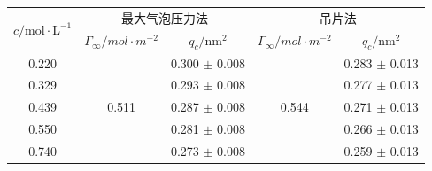 \begin{table}[ht]
\centering
{}
\begin{tabular}{ccccc}
\toprule
\multirow{2}{*}{$c / \mathrm{mol \cdot L^{-1}}$} & \multicolumn{2}{c}{最大气泡压力法} & \multicolumn{2}{c}{吊片法} \\
& $\Gamma_\infty/\si{mol\cdot m^{-2}}$ & $q_c / \mathrm{nm^2}$ & $\Gamma_\infty/\si{mol\cdot m^{-2}}$ & $q_c / \mathrm{nm^2}$ \\
\midrule
0.220 & \multirow{5}{*}{0.511} & 0.300 $\pm$ 0.008 & \multirow{5}{*}{0.544} & 0.283 $\pm$ 0.013\\
0.329 & & 0.293 $\pm$ 0.008 & & 0.277 $\pm$ 0.013\\
0.439 & & 0.287 $\pm$ 0.008 & & 0.271 $\pm$ 0.013\\
0.550 & & 0.281 $\pm$ 0.008 & & 0.266 $\pm$ 0.013\\
0.740 & & 0.273 $\pm$ 0.008 & & 0.259 $\pm$ 0.013\\
\bottomrule
\end{tabular}
\label{tab:6}
\end{table}










